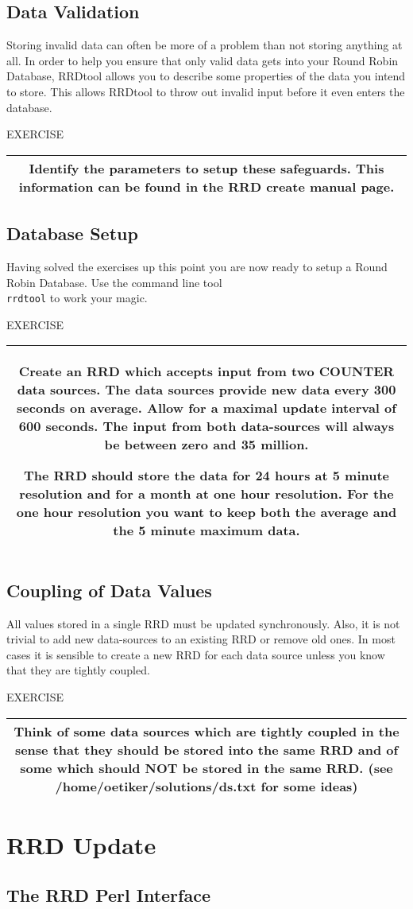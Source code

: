 \documentclass[a4paper,12pt]{article}
\newenvironment{work}{\textsf{\tiny EXERCISE}\nopagebreak\\[0.3ex]\begin{tabular}{|c|}
 \hline
 \begin{minipage}{0.965\linewidth}%
 \setlength{\parskip}{1.6ex plus 0.6ex minus 0.4ex}%
 \rule{0pt}{2.8ex}\ignorespaces}
{\rule[-1.8ex]{0pt}{0pt}\end{minipage}\\
 \hline
 \end{tabular}}
\newcommand{\ex}[1]{\subsection{#1}}
\newcommand{\cmd}[1]{\texttt{\mbox{#1}}}
\begin{document}
\ex{Data Validation}

Storing invalid data can often be more of a problem than not storing
anything at all. In order to help you ensure that only valid data gets
into your Round Robin Database, RRDtool allows you to
describe some properties of the data you intend to store. This allows
RRDtool to throw out invalid input before it even enters the database.

\begin{work}
Identify the parameters to setup these safeguards. This information
can be found in the RRD create manual page.\end{work}

\ex{Database Setup}

Having solved the exercises up this point you are now ready to setup a
Round Robin Database. Use the command line tool\\
\cmd{rrdtool} to work your magic. 

\begin{work}
  Create an RRD which accepts input from two COUNTER
  data sources. The data sources provide new data every 300 seconds on
  average. Allow for a maximal update interval of 600 seconds. The
  input from both data-sources will always be between zero and 35
  million.
  
  The RRD should store the data for 24 hours at 5 minute resolution
  and for a month at one hour resolution. For the one hour resolution
  you want to keep both the average and the 5 minute maximum data.
\end{work}

\ex{Coupling of Data Values}

All values stored in a single RRD must be updated synchronously. Also,
it is not trivial to add new data-sources to an existing RRD or remove
old ones. In most cases it is sensible to create a new RRD for each
data source unless you know that they are tightly coupled.

\begin{work}
  Think of some data sources which are tightly coupled in the sense that
  they should be stored into the same RRD and of some which should NOT be
  stored in the same RRD. (see /home/oetiker/solutions/ds.txt for some ideas)
\end{work}

\newpage
\section{RRD Update}
\ex{The RRD Perl Interface}
\end{document}
